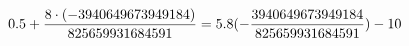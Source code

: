 \documentclass[preview]{standalone}
\begin{document}
\begin{align*}
\special{dvisvgm:raw <g id='unique000'>}0.5 +\frac{8 \cdot (-3940649673949184)}{825659931684591} = 5.8 (- \frac{3940649673949184}{825659931684591}) - 10\special{dvisvgm:raw </g>}
\end{align*}
\end{document}
